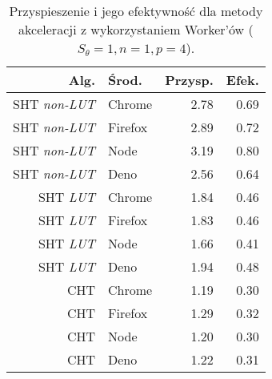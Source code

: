 \begin{wraptable}{r}{7.9cm}
    \caption{Przyspieszenie i jego efektywność dla metody akceleracji z wykorzystaniem Worker'ów \mbox{($S_\theta = 1, n=1, p = 4$)}.}
    \label{tab:speedup}
    \begin{tabular}{rlrr}%
        \hline
        Alg.                 & Środ.   & Przysp. & Efek. \\
        \hline
        SHT \textit{non-LUT} & Chrome  & 2.78    & 0.69  \\
        SHT \textit{non-LUT} & Firefox & 2.89    & 0.72  \\
        SHT \textit{non-LUT} & Node    & 3.19    & \textcolor{green!70!black}{0.80}  \\
        SHT \textit{non-LUT} & Deno    & 2.56    & \textcolor{red!70!black}{0.64}  \\
        \hline
        SHT \textit{LUT}     & Chrome  & 1.84    & 0.46  \\
        SHT \textit{LUT}     & Firefox & 1.83    & 0.46  \\
        SHT \textit{LUT}     & Node    & 1.66    & \textcolor{red!70!black}{0.41}  \\
        SHT \textit{LUT}     & Deno    & 1.94    & \textcolor{green!70!black}{0.48}  \\
        \hline
        CHT                  & Chrome  & 1.19    & \textcolor{red!70!black}{0.30} \\
        CHT                  & Firefox & 1.29    & \textcolor{green!70!black}{0.32}  \\
        CHT                  & Node    & 1.20    & \textcolor{red!70!black}{0.30}  \\
        CHT                  & Deno    & 1.22    & 0.31  \\
        \hline
    \end{tabular}
\end{wraptable}

